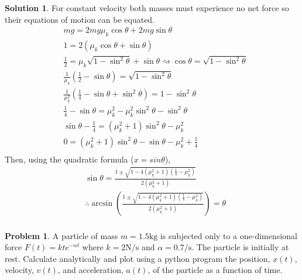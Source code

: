 \documentclass[10pt]{article}
\theoremstyle{definition}
\newtheorem{problem}{Problem}
\newtheorem{soln}{Solution}
\begin{document}
\begin{soln}
      For constant velocity both masses must experience no net force so their equations of motion can be equated.
      \begin{align*}
             & mg=2mg\mu_k\cos\theta+2mg\sin\theta                 \\
             & 1=2\left(\mu_k\cos\theta+\sin\theta\right)         \\
             & \frac{1}{2}=\mu_k\sqrt{1-\sin^2\theta}+\sin\theta \rightsquigarrow \cos\theta=\sqrt{1-\sin^2\theta}       \\
             & \frac{1}{\mu_k}\left(\frac{1}{2}-\sin\theta\right)=\sqrt{1-\sin^2\theta}      \\
             & \frac{1}{\mu_k^2}\left(\frac{1}{4}-\sin\theta+\sin^2\theta\right)=1-\sin^2\theta      \\
             & \frac{1}{4}-\sin\theta=\mu_k^2-\mu_k^2\sin^2\theta-\sin^2\theta      \\
             & \sin\theta-\frac{1}{4}=\left(\mu_k^2+1\right)\sin^2\theta-\mu_k^2     \\
             & 0=\left(\mu_k^2+1\right)\sin^2\theta-\sin\theta-\mu_k^2+\frac{1}{4}     \\
      \end{align*}
      Then, using the quadratic formula ($x=sin\theta$),
      \begin{align*}
            & \sin\theta=\frac{1\pm\sqrt{1-4\left(\mu_k^2+1\right)\left(\frac{1}{4}-\mu_k^2\right)}}{2\left(\mu_k^2+1\right)}\\
            & \therefore \arcsin\left(\frac{1\pm\sqrt{1-4\left(\mu_k^2+1\right)\left(\frac{1}{4}-\mu_k^2\right)}}{2\left(\mu_k^2+1\right)}\right)=\theta\\
      \end{align*}
      
\end{soln}
\newpage
\begin{problem}
A particle of mass $m=1.5\unit{\kilo\gram}$ is subjected only to a one-dimensional force $F(t)=kte^{-\alpha t}$ where $k=2\unit{\newton\per\second}$ and
$\alpha=0.7\unit{\per\second}$. The particle is initially at rest. Calculate analytically and plot using a python program the position,
$x(t)$, velocity, $v(t)$, and acceleration, $a(t)$, of the particle as a function of time.
\end{problem}
\end{document}
